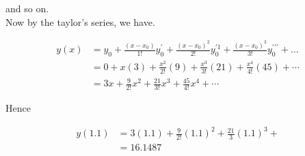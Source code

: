 \documentclass[12pt]{exam}
\begin{document}
\begin{questions}
\begin{parts}
\begin{solution}
and so on.\\
Now by the taylor's series, we have.

$$
\begin{aligned}
y(x) & =y_{0}+\frac{\left(x-x_{0}\right)}{1!} y_{0}^{\prime}+\frac{\left(x-x_{0}\right)^{2}}{2!} y_{0}^{\prime 1}+\frac{\left(x-x_{0}\right)^{3}}{3!} y_{0}^{\prime \prime \prime}+\ldots \\
& =0+x(3)+\frac{x^{2}}{2!}(9)+\frac{x^{3}}{3!}(21)+\frac{x^{4}}{4!}(45)+\cdots \\
& =3 x+\frac{9}{2!} x^{2}+\frac{21}{3!} x^{3}+\frac{45}{4!} x^{4}+\cdots
\end{aligned}
$$

Hence

$$
\begin{aligned}
y(1.1) & =3(1.1)+\frac{9}{2!}(1.1)^{2}+\frac{21}{3}(1.1)^{3}+ \\
& =16.1487
\end{aligned}
$$

    \end{solution}
\end{parts}

\end{questions}
\end{document}
